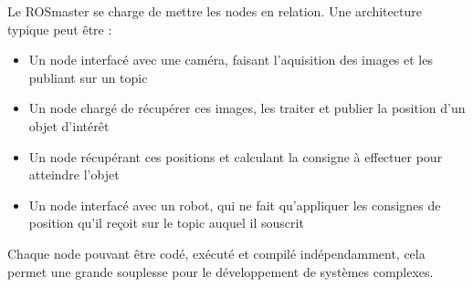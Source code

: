 \documentclass[12pt,a4paper]{article}
\begin{document}
\begin{enumerate}
\begin{itemize}
\end{itemize}
Le ROSmaster se charge de mettre les nodes en relation. Une architecture typique peut être :
\begin{itemize}
\item Un node interfacé avec une caméra, faisant l'aquisition des images et les publiant sur un topic
\item Un node chargé de récupérer ces images, les traiter et publier la position d'un objet d'intérêt
\item Un node récupérant ces positions et calculant la consigne à effectuer pour atteindre l'objet
\item Un node interfacé avec un robot, qui ne fait qu'appliquer les consignes de position qu'il reçoit sur le topic auquel il souscrit
\end{itemize}
Chaque node pouvant être codé, exécuté et compilé indépendamment, cela permet une grande souplesse pour le développement de systèmes complexes.

\end{enumerate}
\end{document}
